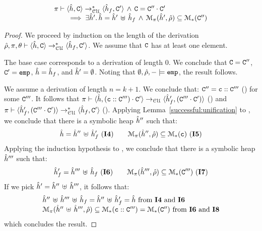  
\begin{lemma}
\label{lemma:iter:cell:unification}
$$
\begin{array}{l}
  \cellunificationiter{\sheap, \cells}{\sheap_f,  \cells'}{\pc} \, \wedge \, \cells = \cells'' \lstconcat \cells'  \\ 
       \qquad \implies
             \exists \sheap' . \, \sheap = \sheap' \dunion \sheap_f  \, \wedge \, 
		\smodels{\sheap', \sstore}{\pc} \subseteq \sepmodels{\cells''}
 \end{array}
$$
\end{lemma}
\begin{proof}
We proceed by induction on the length of the derivation
$\cellunificationiter{\sheap, \cells}{\sheap_f,  \cells'}{\sstore, \pc, \subst}$. 
We assume that $\cells$ has at least one element. 
\vspace{6pt}

\noindent{} The base case corresponds to a derivation of length $0$.
We conclude that  $\cells = \cells''$, $\cells' = \lemp$, $\sheap = \sheap_f$, and $\sheap' = \hemp$. 
Noting that $\hemp, \sstore, - \satisfies \lemp$, the result follows. 
\vspace{6pt}

\noindent{} We assume a derivation of length $n=k+1$. 
We conclude that: $\cells'' = \cell \lstcons \cells'''$ () for some $\cells'''$. It follows 
that $\cellunification{\sheap, (\cell \lstcons \cells''') \lstconcat \cells'}{\sheap_f',  (\cells''' \lstconcat \cells')}{\pc}$ () and 
$\cellunificationiter{\sheap_f',  (\cells''' \lstconcat \cells')}{\sheap_f,  \cells'}{\pc}$  ().
Applying Lemma~\ref{successful:unification} to , we conclude that 
there is a symbolic heap $\sheap''$ such that: 
$$
 \sheap = \sheap'' \dunion \sheap_f' \text{ (\ieq{4})}
  \qquad 
  \smodels{\sheap'', \sstore}{\pc} \subseteq \sepmodels{\cell}  \text{ (\ieq{5})}
$$
Applying the induction hypothesis to , we conclude that there is a symbolic heap 
$\sheap'''$ such that: 
$$
  \sheap_f' = \sheap''' \dunion \sheap_f  \text{ (\ieq{6})}
  \qquad 
  \smodels{\sheap''', \sstore}{\pc} \subseteq \sepmodels{\cells'''}  \text{ (\ieq{7})}
$$
If we pick $\sheap' = \sheap'' \dunion \sheap'''$, it follows that: 
$$
\begin{array}{l}
   \sheap'' \dunion \sheap''' \dunion \sheap_f = \sheap'' \dunion \sheap_f' = \sheap  \text{ from \ieq{4} and \ieq{6}}\\
   \smodels{\sheap'' \dunion \sheap''', \sstore}{\pc} \subseteq \sepmodels{\cell \lstcons \cells'''} = \sepmodels{\cells''} \text{ from \ieq{6} and \ieq{8}}
\end{array}
$$
which concludes the result. 		
\end{proof}

